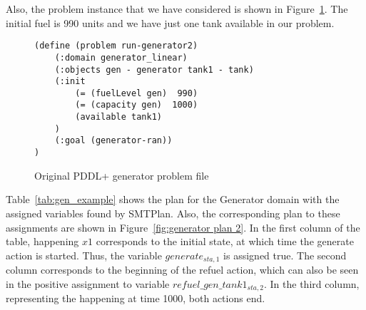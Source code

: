 Also, the problem instance that we have considered is shown in Figure~\ref{fig:gen_problem file}. The initial fuel is 990 units and we have just one tank available in our problem. 

\begin{figure}[thb]
\small
\begin{verbatim}
(define (problem run-generator2)
    (:domain generator_linear)
    (:objects gen - generator tank1 - tank)
    (:init
		(= (fuelLevel gen)  990)
		(= (capacity gen)  1000)
		(available tank1)
    )  
	(:goal (generator-ran))
)
\end{verbatim}
\caption{Original PDDL+ generator problem file}
\label{fig:gen_problem file}
\end{figure}


Table~\ref{tab:gen_example} shows the plan for the Generator domain with the assigned variables found by SMTPlan. Also, the corresponding plan to these assignments are shown in Figure~\ref{fig:generator plan 2}. In the first column of the table, happening $x1$ corresponds to the initial state, at which time the generate action is started. Thus, the variable $generate_{sta,1}$ is assigned true. The second column corresponds to the beginning of the refuel action, which can also be seen in the positive assignment to variable $refuel\_gen\_tank1_{sta,2}$. In the third column, representing the happening at time 1000, both actions end.

